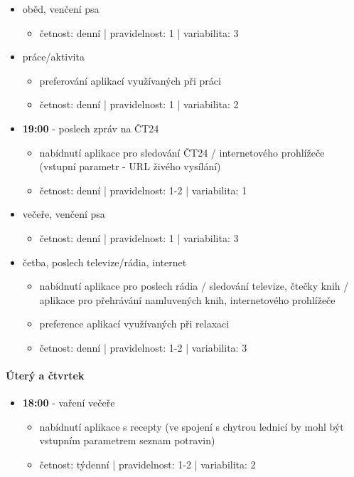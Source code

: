 \documentclass[thesis=M,czech]{FITthesis}[2012/06/26]
\begin{document}
\begin{itemize}
\begin{itemize}
\end{itemize}
    \item oběd, venčení psa
\begin{itemize}
        \item četnost: denní | pravidelnost: 1 | variabilita: 3
\end{itemize}
    \item práce/aktivita
\begin{itemize}
        \item preferování aplikací využívaných při práci
        \item četnost: denní | pravidelnost: 1 | variabilita: 2
\end{itemize}
    \item \textbf{19:00} - poslech zpráv na ČT24
\begin{itemize}
        \item nabídnutí aplikace pro sledování ČT24 / internetového prohlížeče (vstupní parametr - URL živého vysílání)
        \item četnost: denní | pravidelnost: 1-2 | variabilita: 1
\end{itemize}
    \item večeře, venčení psa
\begin{itemize}
        \item četnost: denní | pravidelnost: 1 | variabilita: 3
\end{itemize}
    \item četba, poslech televize/rádia, internet
\begin{itemize}
        \item nabídnutí aplikace pro poslech rádia / sledování televize, čtečky knih / aplikace pro přehrávání namluvených knih, internetového prohlížeče
        \item preference aplikací využívaných při relaxaci
        \item četnost: denní | pravidelnost: 1-2 | variabilita: 3
\end{itemize}
\end{itemize}

\paragraph{Úterý a čtvrtek}
\begin{itemize}
    \item \textbf{18:00} - vaření večeře
\begin{itemize}
        \item nabídnutí aplikace s recepty (ve spojení s chytrou lednicí by mohl být vstupním parametrem seznam potravin)

        \item četnost: týdenní | pravidelnost: 1-2 | variabilita: 2
\end{itemize}
\end{itemize}
\end{document}
